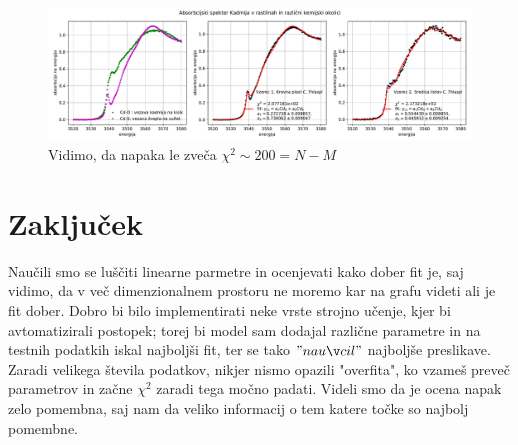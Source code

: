 \documentclass[11pt, a4paper]{article}
\begin{document}
\begin{figure}[H]
\hspace*{-2cm}     
  \includegraphics[width=20cm]{tretja_fit_brez_vpliva.pdf}
  \caption{Vidimo, da napaka le zveča $\chi^2 \sim 200 = N-M$} 
\end{figure}




\section{Zaključek}
Naučili smo se luščiti linearne parmetre in ocenjevati kako dober fit je, saj vidimo, da v več dimenzionalnem prostoru ne moremo kar na grafu videti ali je fit dober. Dobro bi bilo implementirati neke vrste strojno učenje, kjer bi avtomatizirali postopek; torej bi model sam dodajal različne parametre in na testnih podatkih iskal najboljši fit, ter se tako $"naučil"$ najboljše preslikave. Zaradi velikega števila podatkov, nikjer nismo opazili "overfita", ko vzameš preveč parametrov in začne $\chi^2$ zaradi tega močno padati. Videli smo da je ocena napak zelo pomembna, saj nam da veliko informacij o tem katere točke so najbolj pomembne.
\end{document}
